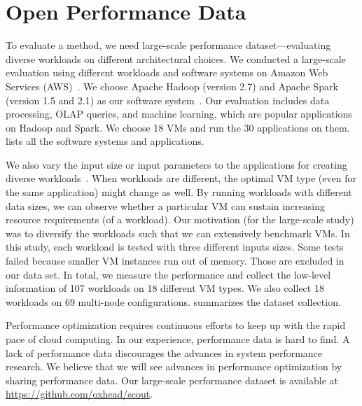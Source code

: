 \section{Open Performance Data}
\label{sec:cat::dataset}

To evaluate a \cat method,
we need large-scale performance dataset---evaluating diverse workloads on different architectural choices.
We conducted a large-scale evaluation using different workloads and software systems on Amazon Web Services (AWS)~\cite{aws}.
We choose Apache Hadoop (version 2.7) and Apache Spark (version 1.5 and 2.1) as our software system~\cite{hadoop, spark}.
Our evaluation includes data processing, OLAP queries, and machine learning, which are popular applications on Hadoop and Spark.
We choose 18 VMs and run the 30 applications on them. \mytable{\ref{tab:dataset}} lists all the software systems and
applications.






We also vary the input size or input parameters to the applications for creating diverse workloads~\cite{Dalibard2017}.
When workloads are different, the optimal VM type (even for the same application) might change as well.
By running workloads with different data sizes, we can observe whether a particular VM can sustain increasing resource requirements (of a workload).
Our motivation (for the large-scale study) was to diversify the workloads such that we can extensively benchmark VMs.
In this study, each workload is tested with three different inputs sizes.
Some tests failed because smaller VM instances run out of memory.
Those are excluded in our data set.
In total, we measure the performance and collect the low-level information of 107 workloads on 18 different VM types.
We also collect 18 workloads on 69 multi-node configurations.
\mytable{\ref{tab:dataset_overview}} summarizes the dataset collection.




Performance optimization requires continuous efforts
to keep up with the rapid pace of cloud computing.
In our experience, performance data is hard to find.
A lack of performance data discourages the advances
in system performance research.
We believe that we will see advances in performance optimization
by sharing performance data.
Our large-scale performance dataset is available at
\url{https://github.com/oxhead/scout}.
